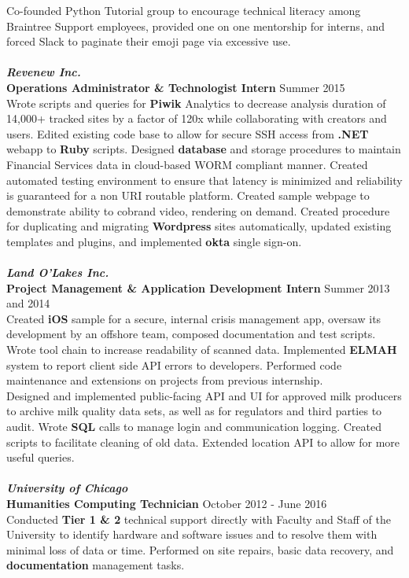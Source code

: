\documentclass[line,margin]{res}
\begin{document}
\begin{resume}
Co-founded Python Tutorial group to encourage technical literacy among Braintree Support employees, provided one on one mentorship for interns, and forced Slack to paginate their emoji page via excessive use.
\\\\
\textbf{\textit{Revenew Inc.}}\\
\textbf{Operations Administrator \& Technologist Intern} \hfill Summer 2015\\
Wrote scripts and queries for \textbf{Piwik} Analytics to decrease analysis duration of 14,000+ tracked sites by a factor of 120x while collaborating with creators and users. Edited existing code base to allow for secure SSH access from \textbf{.NET} webapp to \textbf{Ruby} scripts. Designed \textbf{database} and storage procedures to maintain Financial Services data in cloud-based WORM compliant manner. Created automated testing environment to ensure that latency is minimized and reliability is guaranteed for a non URI routable platform. Created sample webpage to demonstrate ability to cobrand video, rendering on demand. Created procedure for duplicating and migrating \textbf{Wordpress} sites automatically, updated existing templates and plugins, and implemented \textbf{okta} single sign-on.
\\\\
\textbf{\textit{Land O'Lakes Inc.}}\\
\textbf{Project Management \& Application Development Intern} \hfill Summer 2013 and 2014\\
Created \textbf{iOS} sample for a secure, internal crisis management app, oversaw its development by an offshore team, composed documentation and test scripts. Wrote tool chain to increase readability of scanned data. Implemented \textbf{ELMAH} system to report client side API errors to developers. Performed code maintenance and extensions on projects from previous internship.
\\
Designed and implemented public-facing API and UI for approved milk producers to archive milk quality data sets, as well as for regulators and third parties to audit. Wrote \textbf{SQL} calls to manage login and communication logging. Created scripts to facilitate cleaning of old data. Extended location API to allow for more useful queries.
\\\\
\textbf{\textit{University of Chicago}}\\
\textbf{Humanities Computing Technician} \hfill October 2012 - June 2016\\
Conducted \textbf{Tier 1 \& 2} technical support directly with Faculty and Staff of the University to identify hardware and software issues and to resolve them with minimal loss of data or time. Performed on site repairs, basic data recovery, and \textbf{documentation} management tasks.


\end{resume}
\end{document}
